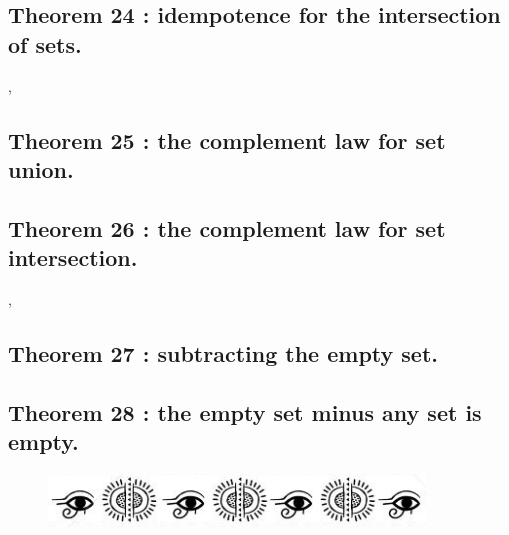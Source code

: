 \documentclass[preview]{standalone}
\begin{document}
\subsection[Idempotence for the intersection of sets.]
    {
        \color{section}Theorem 24 \color{black} : idempotence for the intersection of sets.
    }

\sep


\subsection[The complement law for set union.]
    {
        \color{section}Theorem 25 \color{black} : the complement law for set union.
    }

\pagebreak


\subsection[The complement law for set intersection.]
    {
        \color{section}Theorem 26 \color{black} : the complement law for set intersection.
    }

\sep


\subsection[Subtracting the empty set.]
    {
        \color{section}Theorem 27 \color{black} : subtracting the empty set.
    }

\pagebreak


\subsection[The empty set minus any set is empty.]
    {
        \color{section}Theorem 28 \color{black} : the empty set minus any set is empty.
    }

\vspace{.9\baselineskip}
\begin{figure}[!h]
    \centering
    \includegraphics[width=10cm]{../resources/jpg/2.2.set.operations/border2.jpg}
\end{figure}
\end{document}

